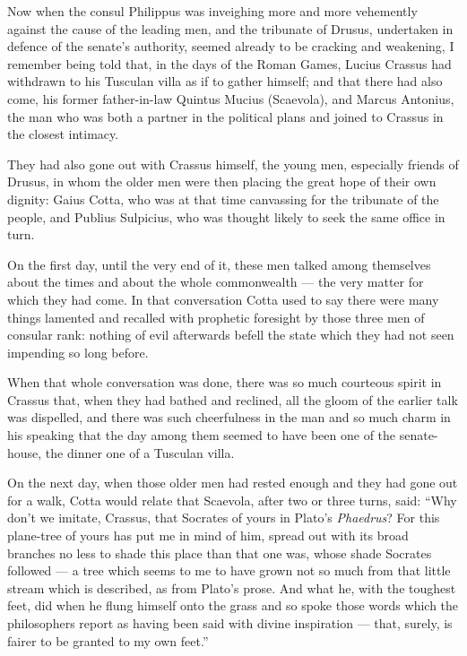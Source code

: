  Now when the consul Philippus was inveighing more and more vehemently against the cause of the leading men, and the tribunate of Drusus, undertaken in defence of the senate's authority, seemed already to be cracking and weakening, I remember being told that, in the days of the Roman Games, Lucius Crassus had withdrawn to his Tusculan villa as if to gather himself; and that there had also come, his former father-in-law Quintus Mucius (Scaevola), and Marcus Antonius, the man who was both a partner in the political plans and joined to Crassus in the closest intimacy.

 They had also gone out with Crassus himself, the young men, especially friends of Drusus, in whom the older men were then placing the great hope of their own dignity: Gaius Cotta, who was at that time canvassing for the tribunate of the people, and Publius Sulpicius, who was thought likely to seek the same office in turn.

 On the first day, until the very end of it, these men talked among themselves about the times and about the whole commonwealth — the very matter for which they had come. In that conversation Cotta used to say there were many things lamented and recalled with prophetic foresight by those three men of consular rank: nothing of evil afterwards befell the state which they had not seen impending so long before.

 When that whole conversation was done, there was so much courteous spirit in Crassus that, when they had bathed and reclined, all the gloom of the earlier talk was dispelled, and there was such cheerfulness in the man and so much charm in his speaking that the day among them seemed to have been one of the senate-house, the dinner one of a Tusculan villa.

 On the next day, when those older men had rested enough and they had gone out for a walk, Cotta would relate that Scaevola, after two or three turns, said: ``Why don't we imitate, Crassus, that Socrates of yours in Plato's \textit{Phaedrus}? For this plane-tree of yours has put me in mind of him, spread out with its broad branches no less to shade this place than that one was, whose shade Socrates followed — a tree which seems to me to have grown not so much from that little stream which is described, as from Plato's prose. And what he, with the toughest feet, did when he flung himself onto the grass and so spoke those words which the philosophers report as having been said with divine inspiration — that, surely, is fairer to be granted to my own feet.''


